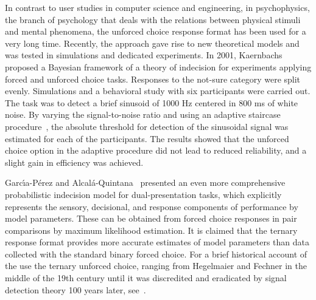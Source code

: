 \documentclass[a4paper,conference]{IEEEtran}
\begin{document}


In contrast to user studies in computer science and engineering, in psychophysics, the branch of psychology that deals with the relations between physical stimuli and mental phenomena, the unforced choice response format has been used for a very long time. Recently, the approach gave rise to new theoretical models and was tested in simulations and dedicated experiments. In 2001, Kaernbachs~\cite{kaernbach2001adaptive} proposed a Bayesian framework of a theory of indecision for experiments applying forced and unforced choice tasks. Responses to the not-sure category were split evenly. Simulations and a behavioral study with six participants were carried out. The task was to detect a brief sinusoid of 1000 Hz centered in 800 ms of white noise. By varying the signal-to-noise ratio and using an adaptive staircase procedure~\cite{kaernbach1991simple}, the absolute threshold for detection of the sinusoidal signal was estimated for each of the participants. The results showed that the unforced choice option in the adaptive procedure did not lead to reduced reliability, and a slight gain in efficiency was achieved.

Garc{\'\i}a-P{\'e}rez and Alcal{\'a}-Quintana~\cite{garcia2017indecision} presented an even more comprehensive probabilistic indecision model for dual-presentation tasks, which explicitly represents the sensory, decisional, and response components of performance by model parameters. These can be obtained from forced choice responses in pair comparisons by maximum likelihood estimation. It is claimed that the ternary response format provides more accurate estimates of model parameters than data collected with the standard binary forced choice. 
For a brief historical account of the use the ternary unforced choice, ranging from Hegelmaier and Fechner in the middle of the 19th century until it was discredited and eradicated by signal detection theory 100 years later, see~\cite{garcia2019Thedos}.
\end{document}
